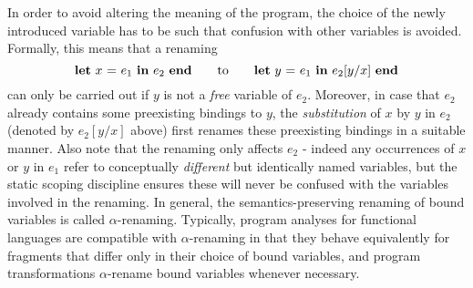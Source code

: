 {In order to avoid altering the meaning of the program, the choice of
the newly introduced variable has to be such that confusion with other
variables is avoided. Formally, this means that a renaming {\small $$\mathbf{let}\ {x}\ \mathbf{=}\ {e_1}\ \mathbf{in}\ {e_2}\ \mathbf{end} \qquad \textrm{\normalsize to} \qquad \mathbf{let}\ {y}\ \mathbf{=}\ {e_1}\ \mathbf{in}\ {e_2[y/x]}\ \mathbf{end}$$} can only be carried out if
$y$ is not a \emph{free} variable of $e_2$. Moreover, in case that
$e_2$ already contains some preexisting bindings to $y$, the
\emph{substitution} of $x$ by $y$ in $e_2$ (denoted by $e_2[y/x]$
above) first renames these preexisting bindings in a suitable manner.
Also note that the renaming only affects $e_2$ - indeed any
occurrences of $x$ or $y$ in $e_1$ refer to conceptually
\emph{different} but identically named variables, but the static
scoping discipline ensures these will never be confused with the
variables involved in the renaming.
%
%
In general, the semantics-preserving renaming of bound variables is
called $\alpha$-renaming. Typically, program analyses for functional
languages are compatible with $\alpha$-renaming in that they behave
equivalently for fragments that differ only in their choice of bound
variables, and program transformations $\alpha$-rename bound variables
whenever necessary.

}
